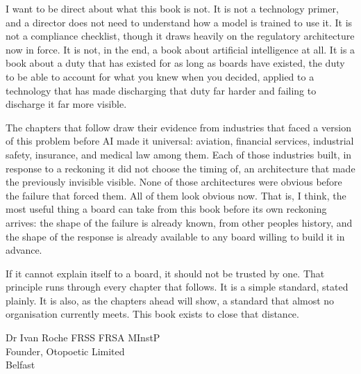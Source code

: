 I want to be direct about what this book is not. It is not a technology primer, and a director does not need to understand how a model is trained to use it. It is not a compliance checklist, though it draws heavily on the regulatory architecture now in force. It is not, in the end, a book about artificial intelligence at all. It is a book about a duty that has existed for as long as boards have existed, the duty to be able to account for what you knew when you decided, applied to a technology that has made discharging that duty far harder and failing to discharge it far more visible.

The chapters that follow draw their evidence from industries that faced a version of this problem before AI made it universal: aviation, financial services, industrial safety, insurance, and medical law among them. Each of those industries built, in response to a reckoning it did not choose the timing of, an architecture that made the previously invisible visible. None of those architectures were obvious before the failure that forced them. All of them look obvious now. That is, I think, the most useful thing a board can take from this book before its own reckoning arrives: the shape of the failure is already known, from other people\textquotesingle s history, and the shape of the response is already available to any board willing to build it in advance.

If it cannot explain itself to a board, it should not be trusted by one. That principle runs through every chapter that follows. It is a simple standard, stated plainly. It is also, as the chapters ahead will show, a standard that almost no organisation currently meets. This book exists to close that distance.

\begin{flushright}
\vspace{0.6em}
Dr Ivan Roche FRSS FRSA MInstP\\
Founder, Otopoetic Limited\\
Belfast
\end{flushright}
